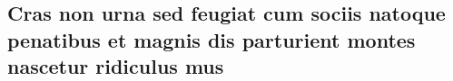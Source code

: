 \documentclass[
article,			%
11pt,				%
twoside,			%
a4paper,			%
twocolumn,          %
english,			%
brazil,				%
sumario=tradicional
]{abntex2}
\begin{document}
    \vspace{1cm}
    \begin{anexosenv}
        
        \chapter{Cras non urna sed feugiat cum sociis natoque penatibus et magnis dis
            parturient montes nascetur ridiculus mus}
        
        \lipsum[31]
        
    \end{anexosenv}
\end{document}
